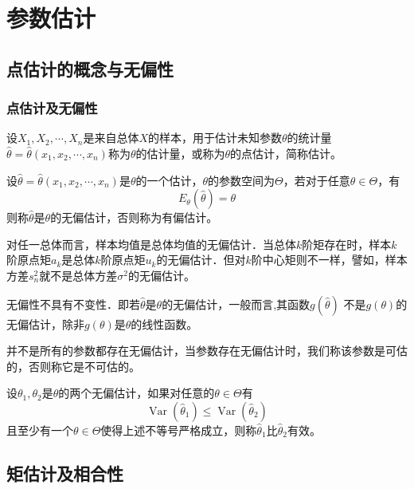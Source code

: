 \chapter{参数估计}
\section{点估计的概念与无偏性}
\subsection{点估计及无偏性}
\begin{definition}
    设$X_1,X_2,\cdots,X_n$是来自总体$X$的样本，用于估计未知参数$\theta$的统计量$\hat{\theta}=\hat{\theta}(x_1, x_2 , \cdots,x_n)$称为$\theta$的估计量，或称为$\theta$的点估计，简称估计。
\end{definition}
\begin{definition}
    设$\hat{\theta}=\hat{\theta}(x_1, x_2 , \cdots,x_n)$是$\theta$的一个估计，$\theta$的参数空间为$\Theta$，若对于任意$\theta\in\Theta$，有
    $$
        E_{\theta}(\hat{\theta})=\theta
    $$
    则称$\hat{\theta}$是$\theta$的无偏估计，否则称为有偏估计。
\end{definition}

对任一总体而言，样本均值是总体均值的无偏估计．当总体$k$阶矩存在时，样本$k$阶原点矩$a_k$是总体$k$阶原点矩$u_k$的无偏估计．但对$k$阶中心矩则不一样，譬如，样本方差$s_n^2$就不是总体方差$\sigma^2$的无偏估计。

无偏性不具有不变性．即若$\hat{\theta}$是$\theta$的无偏估计，一般而言,其函数$g(\hat\theta)$ 不是$g(\theta)$的无偏估计，除非$g(\theta)$是$\theta$的线性函数。

并不是所有的参数都存在无偏估计，当参数存在无偏估计时，我们称该参数是可估的，否则称它是不可估的。

\begin{definition}
    设$\theta_1 ,\theta_2$是$\theta$的两个无偏估计，如果对任意的$\theta \in \Theta$有
    $$
        \operatorname{Var}(\hat{\theta}_1) \leq \operatorname{Var}(\hat{\theta}_2)
    $$
    且至少有一个$\theta \in \Theta$使得上述不等号严格成立，则称$\hat{\theta}_1$比$\hat{\theta}_2$有效。
\end{definition}


\section{矩估计及相合性}
